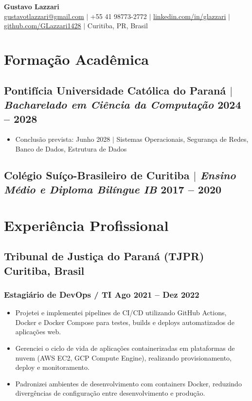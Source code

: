 \documentclass[10pt]{article}
\begin{document}
\begin{center}
	{\LARGE\bfseries Gustavo Lazzari} \\
	\vspace{2pt}
	\href{mailto:gustavotlazzari@gmail.com}{gustavotlazzari@gmail.com} $|$
	+55 41 98773-2772 $|$
	\href{https://www.linkedin.com/in/glazzari}{linkedin.com/in/glazzari} $|$
	\href{https://github.com/GLazzari1428}{github.com/GLazzari1428} $|$
	Curitiba, PR, Brasil
\end{center}

\section{Forma\c{c}\~{a}o Acad\^{e}mica}
\subsection{Pontif\'{i}cia Universidade Cat\'{o}lica do Paran\'{a} $|$ {\normalfont\itshape Bacharelado em Ci\^{e}ncia da Computa\c{c}\~{a}o} \hfill 2024 -- 2028}
\begin{itemize}
	\item Conclus\~{a}o prevista: Junho 2028 $|$ Sistemas Operacionais, Seguran\c{c}a de Redes, Banco de Dados, Estrutura de Dados
\end{itemize}
\subsection{Col\'{e}gio Su\'{i}\c{c}o-Brasileiro de Curitiba $|$ {\normalfont\itshape Ensino M\'{e}dio e Diploma Bil\'{i}ngue IB} \hfill 2017 -- 2020}

\section{Experi\^{e}ncia Profissional}
\subsection{Tribunal de Justi\c{c}a do Paran\'{a} (TJPR) \hfill Curitiba, Brasil}
\subsubsection{Estagi\'{a}rio de DevOps / TI \hfill Ago 2021 -- Dez 2022}
\begin{itemize}
	\item Projetei e implementei pipelines de CI/CD utilizando GitHub Actions, Docker e Docker Compose para testes, builds e deploys automatizados de aplica\c{c}\~{o}es web.
	\item Gerenciei o ciclo de vida de aplica\c{c}\~{o}es containerizadas em plataformas de nuvem (AWS EC2, GCP Compute Engine), realizando provisionamento, deploy e monitoramento.
	\item Padronizei ambientes de desenvolvimento com containers Docker, reduzindo diverg\^{e}ncias de configura\c{c}\~{a}o entre desenvolvimento e produ\c{c}\~{a}o.
\end{itemize}
\end{document}
